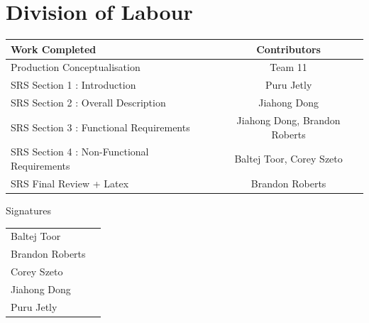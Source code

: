 \documentclass[]{article}
\begin{document}


\appendix
\section{Division of Labour}
\label{sec:division_of_labour}

\begin{center}
\large
			\begin{tabular}{l|c}
				Work Completed   & Contributors \\\hline
				Production Conceptualisation &Team 11 \\
				SRS Section 1 : Introduction & Puru Jetly \\
				SRS Section 2 : Overall Description  & Jiahong Dong \\
				SRS Section 3 : Functional Requirements  & Jiahong Dong, Brandon Roberts  \\
				SRS Section 4 : Non-Functional Requirements  & Baltej Toor, Corey Szeto \\
				SRS Final Review + Latex  & Brandon Roberts \\
			\end{tabular}
			\vspace{0.1in}
\huge Signatures
\end{center}
			\vspace{0.3in}
\large
			\begin{tabular}{l|r}
			\vspace{1in}
				Baltej Toor  & \underline{\hspace{8cm}} \\
			\vspace{1in}
				Brandon Roberts   & \underline{\hspace{8cm}} \\
			\vspace{1in}
				Corey Szeto  & \underline{\hspace{8cm}} \\
			\vspace{1in}
				Jiahong Dong   & \underline{\hspace{8cm}} \\
			\vspace{1in}
				Puru Jetly   & \underline{\hspace{8cm}} \\
			\end{tabular}
\end{document}
